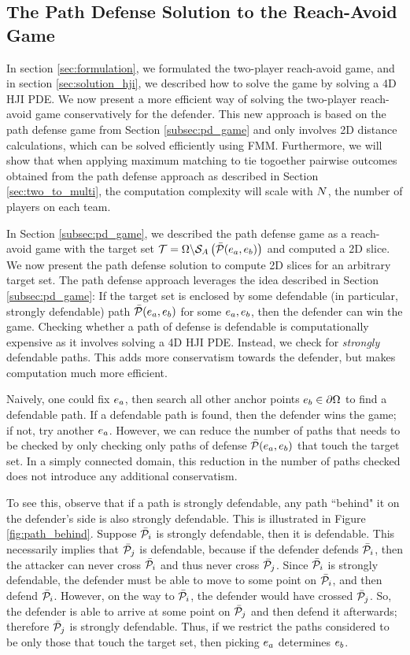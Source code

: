 \subsection{The Path Defense Solution to the Reach-Avoid Game}
\label{subsec:reach_avoid}
In section \ref{sec:formulation}, we formulated the two-player reach-avoid game, and in section \ref{sec:solution_hji}, we described how to solve the game by solving a 4D HJI PDE. We now present a more efficient way of solving the two-player reach-avoid game conservatively for the defender. This new approach is based on the path defense game from Section \ref{subsec:pd_game} and only involves 2D distance calculations, which can be solved efficiently using FMM. Furthermore, we will show that when applying maximum matching to tie togoether pairwise outcomes obtained from the path defense approach as described in Section \ref{sec:two_to_multi}, the computation complexity will scale with $N$, the number of players on each team.

In Section \ref{subsec:pd_game}, we described the path defense game as a reach-avoid game with the target set $\mathcal{T}=\Omega\backslash\mathcal{S}_A\left(\bar{\mathcal{P}}(e_a,e_b)\right)$ and computed a 2D slice. We now present the path defense solution to compute 2D slices for an arbitrary target set. The path defense approach leverages the idea described in Section \ref{subsec:pd_game}: If the target set is enclosed by some defendable (in particular, strongly defendable) path $\bar{\mathcal{P}}(e_a,e_b)$ for some $e_a,e_b$, then the defender can win the game. Checking whether a path of defense is defendable is computationally expensive as it involves solving a 4D HJI PDE. Instead, we check for \textit{strongly} defendable paths. This adds more conservatism towards the defender, but makes computation much more efficient.

Naively, one could fix $e_a$, then search all other anchor points $e_b\in\partial\Omega$ to find a defendable path. If a defendable path is found, then the defender wins the game; if not, try another $e_a$. However, we can reduce the number of paths that needs to be checked by only checking only paths of defense $\bar{\mathcal{P}}(e_a,e_b)$ that touch the target set. In a simply connected domain, this reduction in the number of paths checked does not introduce any additional conservatism. 

To see this, observe that if a path is strongly defendable, any path ``behind" it on the defender's side is also strongly defendable. This is illustrated in Figure \ref{fig:path_behind}. Suppose $\bar{\mathcal{P}}_{i}$ is strongly defendable, then it is defendable. This necessarily implies that $\bar{\mathcal{P}}_{j}$ is defendable, because if the defender defends $\bar{\mathcal{P}}_{i}$, then the attacker can never cross $\bar{\mathcal{P}}_{i}$ and thus never cross $\bar{\mathcal{P}}_{j}$. Since $\bar{\mathcal{P}}_{i}$ is strongly defendable, the defender must be able to move to some point on $\bar{\mathcal{P}}_{i}$, and then defend $\bar{\mathcal{P}}_{i}$. However, on the way to $\bar{\mathcal{P}}_{i}$, the defender would have crossed $\bar{\mathcal{P}}_{j}$. So, the defender is able to arrive at some point on $\bar{\mathcal{P}}_{j}$ and then defend it afterwards; therefore $\bar{\mathcal{P}}_{j}$ is strongly defendable. Thus, if we restrict the paths considered to be only those that touch the target set, then picking $e_a$ determines $e_b$. 


